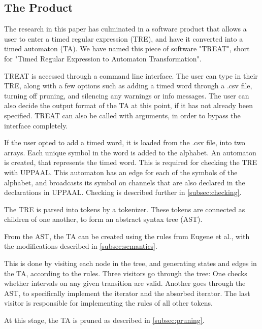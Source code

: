 \subsection{The Product}\label{subsec:theProduct}
The research in this paper has culminated in a software product that allows a user to enter a timed regular expression (TRE), and have it converted into a timed automaton (TA).
We have named this piece of software "TREAT", short for "Timed Regular Expression to Automaton Transformation".

TREAT is accessed through a command line interface. The user can type in their TRE, along with a few options such as adding a timed word through a .csv file, turning off pruning, and silencing any warnings or info messages.
The user can also decide the output format of the TA at this point, if it has not already been specified. 
TREAT can also be called with arguments, in order to bypass the interface completely.

If the user opted to add a timed word, it is loaded from the .csv file, into two arrays. Each unique symbol in the word is added to the alphabet.
An automaton is created, that represents the timed word. This is required for checking the TRE with UPPAAL. This automaton has an edge for each of the symbols of the alphabet, and broadcasts its symbol on channels that are also declared in the declarations in UPPAAL. Checking is described further in \cref{subsec:checking}.

The TRE is parsed into tokens by a tokenizer. These tokens are connected as children of one another, to form an abstract syntax tree (AST). 

From the AST, the TA can be created using the rules from Eugene et al., with the modifications described in \cref{subsec:semantics}.

This is done by visiting each node in the tree, and generating states and edges in the TA, according to the rules. Three visitors go through the tree: One checks whether intervals on any given transition are valid. Another goes through the AST, to specifically implement the iterator and the absorbed iterator. The last visitor is responsible for implementing the rules of all other tokens.

At this stage, the TA is pruned as described in \cref{subsec:pruning}. 

